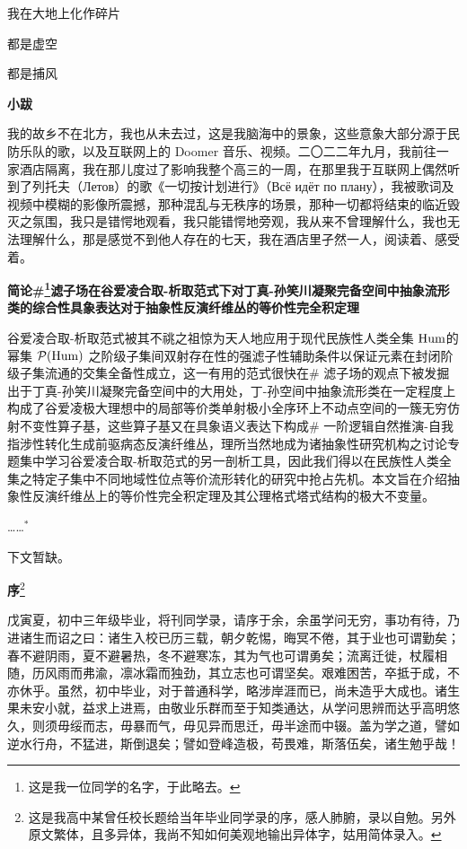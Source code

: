\documentclass{ctexbook}
\begin{document}
    我在大地上化作碎片
    
    都是虚空
    
    都是捕风


\mbox


    {\normalsize \textbf{小跋}}

    {\normalsize 我的故乡不在北方，我也从未去过，这是我脑海中的景象，这些意象大部分源于民防乐队的歌，以及互联网上的 Doomer 音乐、视频。二〇二二年九月，我前往一家酒店隔离，我在那儿度过了影响我整个高三的一周，在那里我于互联网上偶然听到了列托夫（Летов）的歌《一切按计划进行》（Всё идёт по плану），我被歌词及视频中模糊的影像所震撼，那种混乱与无秩序的场景，那种一切都将结束的临近毁灭之氛围，我只是错愕地观看，我只能错愕地旁观，我从来不曾理解什么，我也无法理解什么，那是感觉不到他人存在的七天，我在酒店里孑然一人，阅读着、感受着。}

\newpage
\textbf{简论\#\footnote{\normalsize 这是我一位同学的名字，于此略去。}滤子场在谷爱凌合取-析取范式下对丁真-孙笑川凝聚完备空间中抽象流形类的综合性具象表达对于抽象性反演纤维丛的等价性完全积定理}


\mbox


    谷爱凌合取-析取范式被其不祧之祖惊为天人地应用于现代民族性人类全集 \({\rm Hum}\)的幂集 \(\mathcal{P}({\rm Hum})\)  之阶级子集间双射存在性的强滤子性辅助条件以保证元素在封闭阶级子集流通的交集全备性成立，这一有用的范式很快在\# 滤子场的观点下被发掘出于丁真-孙笑川凝聚完备空间中的大用处，丁-孙空间中抽象流形类在一定程度上构成了谷爱凌极大理想中的局部等价类单射极小全序环上不动点空间的一簇无穷仿射不变性算子基，这些算子基又在具象语义表达下构成\# 一阶逻辑自然推演-自我指涉性转化生成前驱病态反演纤维丛，理所当然地成为诸抽象性研究机构之讨论专题集中学习谷爱凌合取-析取范式的另一剖析工具，因此我们得以在民族性人类全集之特定子集中不同地域性位点等价流形转化的研究中抢占先机。本文旨在介绍抽象性反演纤维丛上的等价性完全积定理及其公理格式塔式结构的极大不变量。
    
    ……\(^*\)

    {\normalsize *下文暂缺。}

\newpage
\textbf{序}\footnote{\normalsize 这是我高中某曾任校长题给当年毕业同学录的序，感人肺腑，录以自勉。另外原文繁体，且多异体，我尚不知如何美观地输出异体字，姑用简体录入。}

    戊寅夏，初中三年级毕业，将刊同学录，请序于余，余虽学问无穷，事功有待，乃进诸生而诏之曰：诸生入校已历三载，朝夕乾惕，晦冥不倦，其于业也可谓勤矣；春不避阴雨，夏不避暑热，冬不避寒冻，其为气也可谓勇矣；流离迁徙，杖履相随，历风雨而弗渝，凛冰霜而独劲，其立志也可谓坚矣。艰难困苦，卒抵于成，不亦休乎。虽然，初中毕业，对于普通科学，略涉岸涯而已，尚未造乎大成也。诸生果未安小就，益求上进焉，由敬业乐群而至于知类通达，从学问思辨而达乎高明悠久，则须毋绥而志，毋暴而气，毋见异而思迁，毋半途而中辍。盖为学之道，譬如逆水行舟，不猛进，斯倒退矣；譬如登峰造极，苟畏难，斯落伍矣，诸生勉乎哉！
    
\end{document}
